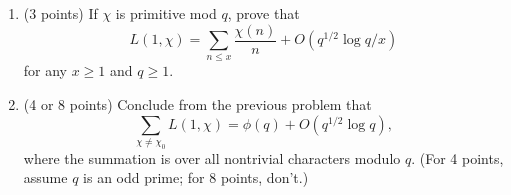 \documentclass[12pt]{article}
\begin{document}
\begin{enumerate}
\item(3 points) If $\chi$ is primitive mod $q$, prove that
\begin{equation}
L(1, \chi) = \sum_{n \leq x} \frac{\chi(n)}{n} + O(q^{1/2} \log q/x)
\end{equation}
for any $x \geq 1$ and $q \geq 1$. 

\item(4 or 8 points)
Conclude from the previous problem that
\begin{equation}
\sum_{\chi \neq \chi_0} L(1, \chi) = \phi(q) + O(q^{1/2} \log q),
\end{equation}
where the summation is over all nontrivial characters modulo $q$.
(For 4 points, assume $q$ is an odd prime; for 8 points, don't.)

\end{enumerate}
\end{document}
